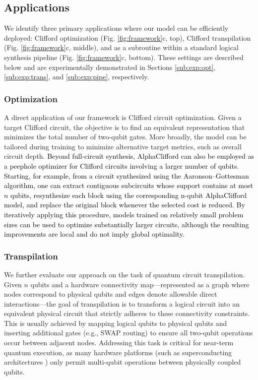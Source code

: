 \documentclass[conference]{IEEEtran}
\newcommand{\nt}[1]{\textcolor{black}{#1}}
\begin{document}
\subsection{Applications}
\label{applications}

We identify three primary applications where our model can be efficiently deployed: Clifford optimization (Fig. \ref{fig:framework}c, top), Clifford transpilation (Fig. \ref{fig:framework}c, middle), and as a subroutine within a standard logical synthesis pipeline (Fig. \ref{fig:framework}c, bottom). These settings are described below and are experimentally demonstrated in Sections \ref{sub:exp:opt}, \ref{sub:exp:trans}, and \ref{sub:exp:pipe}, respectively.

\subsubsection{Optimization}
A direct application of our framework is Clifford circuit optimization. Given a target Clifford circuit, the objective is to find an equivalent representation that minimizes the total number of two-qubit gates. More broadly, the model can be tailored during training to minimize alternative target metrics, such as overall circuit depth. \nt{Beyond full-circuit synthesis, AlphaClifford can also be employed as a peephole  optimizer \cite{peephole} for Clifford circuits involving a larger number of qubits. Starting, for example, from a circuit synthesized using the Aaronson–Gottesman algorithm, one can extract contiguous subcircuits whose support contains at most $n$ qubits, resynthesize each block using the corresponding n-qubit AlphaClifford model, and replace the original block whenever the selected cost is reduced. By iteratively applying this procedure, models trained on relatively small problem sizes can be used to optimize substantially larger circuits, although the resulting improvements are local and do not imply global optimality.}
\subsubsection{Transpilation}

We further evaluate our approach on the task of quantum circuit transpilation. Given $n$ qubits and a hardware connectivity map—represented as a graph where nodes correspond to physical qubits and edges denote allowable direct interactions—the goal of transpilation is to transform a logical circuit into an equivalent physical circuit that strictly adheres to these connectivity constraints. This is usually achieved by mapping logical qubits to physical qubits and inserting additional gates (e.g., SWAP routing) to ensure all two-qubit operations occur between adjacent nodes. 
Addressing this task is critical for near-term quantum execution, as many hardware platforms (such as superconducting architectures \cite{superconductiv}) only permit multi-qubit operations between physically coupled qubits. 
\end{document}
